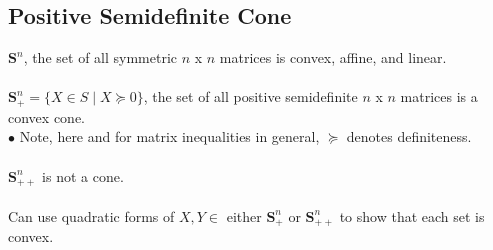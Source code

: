 \documentclass[]{article}
\begin{document}
\subsection*{Positive Semidefinite Cone}
$\boldsymbol{S}^{n}$, the set of all symmetric $n$ x $n$ matrices is convex, affine, and linear. \\\\
$\boldsymbol{S}^{n}_{+} = \{X \in S \mid X \succeq 0\}$, the set of all positive semidefinite $n$ x $n$ matrices is a convex cone. \\
$\bullet$ Note, here and for matrix inequalities in general, $\succeq$ denotes definiteness. \\\\
$\boldsymbol{S}^{n}_{++}$ is not a cone. \\\\
Can use quadratic forms of $X,Y \in$ either $\boldsymbol{S}^{n}_{+}$ or $\boldsymbol{S}^{n}_{++}$ to show that each set is convex.
\end{document}
